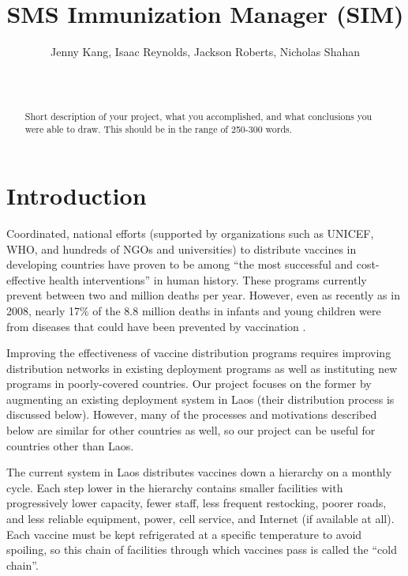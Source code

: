 \documentclass{acm_proc_article-sp}
\begin{document}
\title{SMS Immunization Manager (SIM)}

\author{
       Jenny Kang, Isaac Reynolds, Jackson Roberts, Nicholas Shahan\\
              \\
              \\
}

\maketitle
\begin{abstract}
Short description of your project, what you accomplished, and what conclusions 
you were able to draw. This should be in the range of 250-300 words.
\end{abstract}

\section{Introduction}
Coordinated, national efforts (supported by organizations such as UNICEF, WHO, and hundreds of NGOs and universities) to distribute vaccines in developing countries have proven to be among ``the most successful and cost-effective health interventions'' in human history. These programs currently prevent between two and million deaths per year. However, even as recently as in 2008, nearly 17\% of the 8.8 million deaths in infants and young children were from diseases that could have been prevented by vaccination \cite{who:campaign_essentials}. 

Improving the effectiveness of vaccine distribution programs requires improving distribution networks in existing deployment programs as well as instituting new programs in poorly-covered countries. Our project focuses on the former by augmenting an existing deployment system in Laos (their distribution process is discussed below). However, many of the processes and motivations described below are similar for other countries as well, so our project can be useful for countries other than Laos.

The current system in Laos distributes vaccines down a hierarchy on a monthly cycle. Each step lower in the hierarchy contains smaller facilities with progressively lower capacity, fewer staff, less frequent restocking, poorer roads, and less reliable equipment, power, cell service, and Internet (if available at all). Each vaccine must be kept refrigerated at a specific temperature to avoid spoiling, so this chain of facilities through which vaccines pass is called the ``cold chain''.
\end{document}
